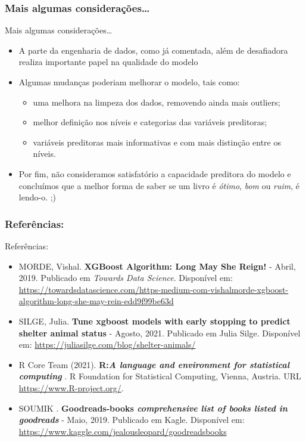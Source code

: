 \documentclass[
  9 pt,
  ignorenonframetext,
]{beamer}
\providecommand{\tightlist}{%
  \setlength{\itemsep}{0pt}\setlength{\parskip}{0pt}}
\begin{document}
\hypertarget{mais-algumas-considerauxe7uxf5es}{%
\subsubsection{Mais algumas
considerações\ldots{}}\label{mais-algumas-considerauxe7uxf5es}}

\begin{frame}{Mais algumas considerações\ldots{}}
\begin{itemize}
\item
  A parte da engenharia de dados, como já comentada, além de desafiadora
  realiza importante papel na qualidade do modelo
\item
  Algumas mudanças poderiam melhorar o modelo, tais como:

  \begin{itemize}
  \tightlist
  \item
    uma melhora na limpeza dos dados, removendo ainda mais outliers;
  \item
    melhor definição nos níveis e categorias das variáveis preditoras;
  \item
    variáveis preditoras mais informativas e com mais distinção entre os
    níveis.
  \end{itemize}
\item
  Por fim, não consideramos satisfatório a capacidade preditora do
  modelo e concluímos que a melhor forma de saber se um livro é
  \emph{ótimo}, \emph{bom} ou \emph{ruim}, é lendo-o. ;)
\end{itemize}
\end{frame}

\hypertarget{referuxeancias}{%
\subsubsection{Referências:}\label{referuxeancias}}

\begin{frame}{Referências:}
\begin{itemize}
\item
  MORDE, Vishal. \textbf{XGBoost Algorithm: Long May She Reign!} -
  Abril, 2019. Publicado em \emph{Towards Data Science}. Disponível em:
  \url{https://towardsdatascience.com/https-medium-com-vishalmorde-xgboost-algorithm-long-she-may-rein-edd9f99be63d}
\item
  SILGE, Julia. \textbf{Tune xgboost models with early stopping to
  predict shelter animal status} - Agosto, 2021. Publicado em Julia
  Silge. Disponível em:
  \url{https://juliasilge.com/blog/shelter-animals/}
\item
  R Core Team (2021). \textbf{R:\emph{A language and environment for
  statistical computing}} . R Foundation for Statistical Computing,
  Vienna, Austria. URL \url{https://www.R-project.org/}.
\item
  SOUMIK . \textbf{Goodreads-books \emph{comprehensive list of books
  listed in goodreads}} - Maio, 2019. Publicado em Kagle. Disponível em:
  \url{https://www.kaggle.com/jealousleopard/goodreadsbooks}
\end{itemize}
\end{frame}
\end{document}
